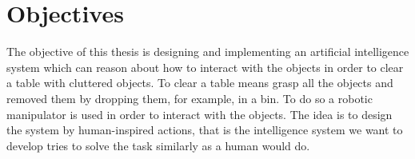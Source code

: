  








\section{Objectives}
The objective of this thesis is designing and implementing an artificial intelligence system which can reason about how to interact with the objects in order to clear a table with cluttered objects. To clear a table means grasp all the objects and removed them by dropping them, for example, in a bin. To do so a robotic manipulator is used in order to interact with the objects. The idea is to design the system by human-inspired actions, that is the intelligence system we want to develop tries to solve the task similarly as a human would do.

